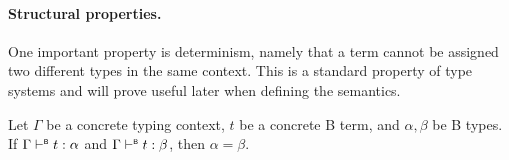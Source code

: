 \paragraph{Structural properties.}

One important property is determinism, namely that a term cannot be assigned two different types in the same context.
This is a standard property of type systems and will prove useful later when defining the semantics.

\begin{theorem}
  Let \(\Gamma\) be a concrete typing context, \(t\) be a concrete B term, and \(\alpha, \beta\) be B types. If \(\Gamma \vdash^{\scriptscriptstyle{\mathsf{B}}} t : \alpha\) and \(\Gamma \vdash^{\scriptscriptstyle{\mathsf{B}}} t : \beta\), then \(\alpha = \beta\).
\end{theorem}
